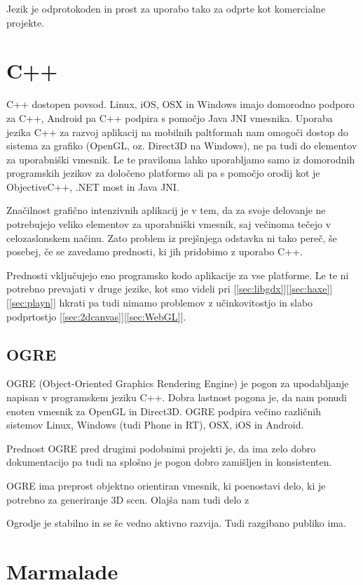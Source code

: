 Jezik je odprotokoden in prost za uporabo tako za odprte kot komercialne projekte.

\section{C++}

C++ dostopen povsod. Linux, iOS, OSX in Windows imajo domorodno podporo za C++, Android pa C++ podpira s pomočjo Java JNI vmesnika. Uporaba jezika C++ za razvoj aplikacij na mobilnih paltformah nam omogoči dostop do sistema za grafiko (OpenGL, oz. Direct3D na Windows), ne pa tudi do elementov za uporabniški vmesnik. Le te praviloma lahko uporabljamo samo iz domorodnih programskih jezikov za določeno platformo ali pa s pomočjo orodij kot je ObjectiveC++, .NET most in Java JNI.

Značilnost grafično intenzivnih aplikacij je v tem, da za svoje delovanje ne potrebujejo veliko elementov za uporabniški vmesnik, saj večinoma tečejo v celozaslonskem načinu. Zato problem iz prejšnjega odstavka ni tako pereč, še posebej, če se zavedamo prednosti, ki jih pridobimo z uporabo C++. 

Prednosti vključujejo eno programsko kodo aplikacije za vse platforme. Le te ni potrebno prevajati v druge jezike, kot smo videli pri [\ref{sec:libgdx}][\ref{sec:haxe}][\ref{sec:playn}] hkrati pa tudi nimamo problemov z učinkovitostjo in slabo podprtostjo [\ref{sec:2dcanvas}][\ref{sec:WebGL}].

\subsection{OGRE}

OGRE (Object-Oriented Graphics Rendering Engine) je pogon za upodabljanje napisan v programskem jeziku C++. Dobra lastnost pogona je, da nam ponudi enoten vmesnik za OpenGL in Direct3D. OGRE podpira večino različnih sistemov Linux, Windows (tudi Phone in RT), OSX, iOS in Android.

Prednost OGRE pred drugimi podobnimi projekti je, da ima zelo dobro dokumentacijo pa tudi na splošno je pogon dobro zamišljen in konsistenten.

OGRE ima preprost objektno orientiran vmesnik, ki poenostavi delo, ki je potrebno za generiranje 3D scen. Olajša nam tudi delo z 

Ogrodje je stabilno in se še vedno aktivno razvija. Tudi razgibano publiko ima.

\section{Marmalade}

